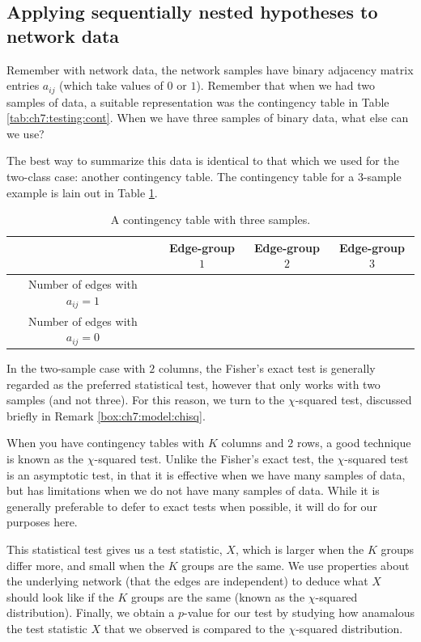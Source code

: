 \subsection{Applying sequentially nested hypotheses to network data}

Remember with network data, the network samples have binary adjacency matrix entries $a_{ij}$ (which take values of $0$ or $1$). Remember that when we had two samples of data, a suitable representation was the contingency table in Table \ref{tab:ch7:testing:cont}. When we have three samples of binary data, what else can we use?

The best way to summarize this data is identical to that which we used for the two-class case: another contingency table. The contingency table for a $3$-sample example is lain out in Table \ref{tab:ch7:model:cont}.

\begin{table}[h]
    \centering
    \begin{tabular}{c | c|c|c}
         & Edge-group $1$ & Edge-group $2$ & Edge-group $3$ \\
         \hline
         Number of edges with $a_{ij} = 1$ & &  & \\
         Number of edges with $a_{ij} = 0$ & &  &
    \end{tabular}
    \caption{A contingency table with three samples.}
    \label{tab:ch7:model:cont}
\end{table}

In the two-sample case with $2$ columns, the Fisher's exact test is generally regarded as the preferred statistical test, however that only works with two samples (and not three). For this reason, we turn to the $\chi$-squared test, discussed briefly in Remark \ref{box:ch7:model:chisq}.

\begin{floatingbox}[h]\caption{The $\chi$-squared test for $2 \times K$ contingency tables}
\label{box:ch7:model:chisq}
When you have contingency tables with $K$ columns and $2$ rows, a good technique is known as the $\chi$-squared test. Unlike the Fisher's exact test, the $\chi$-squared test is an asymptotic test, in that it is effective when we have many samples of data, but has limitations when we do not have many samples of data. While it is generally preferable to defer to exact tests when possible, it will do for our purposes here. 

This statistical test gives us a test statistic, $X$, which is larger when the $K$ groups differ more, and small when the $K$ groups are the same. We use properties about the underlying network (that the edges are independent) to deduce what $X$ should look like if the $K$ groups are the same (known as the $\chi$-squared distribution). Finally, we obtain a $p$-value for our test by studying how anamalous the test statistic $X$ that we observed is compared to the $\chi$-squared distribution.
\end{floatingbox}

